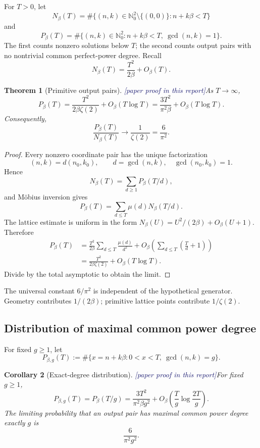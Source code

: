 \documentclass[11pt,oneside]{article}
\newtheorem{theorem}{Theorem}[section]
\newtheorem{corollary}[theorem]{Corollary}
\theoremstyle{definition}
\newcommand{\Nzero}{\mathbb N_0}
\newcommand{\tagPaper}{\textcolor{MidnightBlue}{\textsf{[paper proof in this report]}}}
\begin{document}
For \(T>0\), let
\[
  N_\beta(T)
  =\#\{(n,k)\in\Nzero^2\setminus\{(0,0)\}:n+k\beta<T\}
\]
and
\[
  P_\beta(T)
  =\#\{(n,k)\in\Nzero^2:n+k\beta<T,\ \gcd(n,k)=1\}.
\]
The first counts nonzero solutions below \(T\); the second counts output pairs with no
nontrivial common perfect-power degree.  Recall
\[
  N_\beta(T)=\frac{T^2}{2\beta}+O_\beta(T).
\]

\begin{theorem}[Primitive output pairs]\label{thm:primitive-asymptotic}
\tagPaper As \(T\to\infty\),
\[
  \boxed{\quad
  P_\beta(T)
  =\frac{T^2}{2\beta\zeta(2)}+O_\beta(T\log T)
  =\frac{3T^2}{\pi^2\beta}+O_\beta(T\log T).
  \quad}
\]
Consequently,
\[
  \frac{P_\beta(T)}{N_\beta(T)}\longrightarrow\frac1{\zeta(2)}=\frac6{\pi^2}.
\]
\end{theorem}

\begin{proof}
Every nonzero coordinate pair has the unique factorization
\[
  (n,k)=d(n_0,k_0),
  \qquad d=\gcd(n,k),\quad \gcd(n_0,k_0)=1.
\]
Hence
\[
  N_\beta(T)=\sum_{d\ge1}P_\beta(T/d),
\]
and M\"obius inversion gives
\[
  P_\beta(T)=\sum_{d\le T}\mu(d)N_\beta(T/d).
\]
The lattice estimate is uniform in the form
\(N_\beta(U)=U^2/(2\beta)+O_\beta(U+1)\).  Therefore
\[
\begin{aligned}
  P_\beta(T)
  &=\frac{T^2}{2\beta}\sum_{d\le T}\frac{\mu(d)}{d^2}
    +O_\beta\!\left(\sum_{d\le T}\left(\frac Td+1\right)\right)\\
  &=\frac{T^2}{2\beta\zeta(2)}+O_\beta(T\log T).
\end{aligned}
\]
Divide by the total asymptotic to obtain the limit.
\end{proof}

The universal constant \(6/\pi^2\) is independent of the hypothetical generator.
Geometry contributes \(1/(2\beta)\); primitive lattice points contribute
\(1/\zeta(2)\).

\subsection{Distribution of maximal common power degree}

For fixed \(g\ge1\), let
\[
  P_{\beta,g}(T)
  :=\#\{x=n+k\beta:0<x<T,\ \gcd(n,k)=g\}.
\]

\begin{corollary}[Exact-degree distribution]\label{cor:degree-distribution}
\tagPaper For fixed \(g\ge1\),
\[
  P_{\beta,g}(T)=P_\beta(T/g)
  =\frac{3T^2}{\pi^2\beta g^2}
   +O_\beta\!\left(\frac Tg\log\frac{2T}{g}\right).
\]
The limiting probability that an output pair has maximal common power degree exactly
\(g\) is
\[
  \boxed{\quad \frac{6}{\pi^2g^2}.\quad}
\]
\end{corollary}
\end{document}
